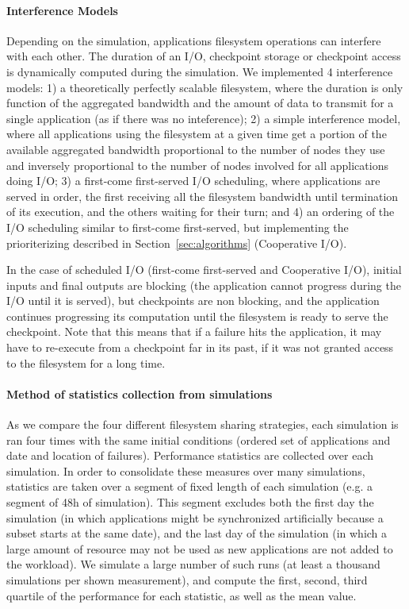 \documentclass[conference]{IEEEtran}
\begin{document}
\paragraph*{Interference Models}
Depending on the simulation, applications filesystem operations can
interfere with each other. The duration of an I/O, checkpoint storage
or checkpoint access is dynamically computed during the simulation. We
implemented 4 interference models: 1) a theoretically perfectly scalable
filesystem, where the duration is only function of the aggregated
bandwidth and the amount of data to transmit for a single application
(as if there was no inteference); 2) a simple interference model,
where all applications using the filesystem at a given time get a
portion of the available aggregated bandwidth proportional to the
number of nodes they use and inversely proportional to the number of
nodes involved for all applications doing I/O; 3) a first-come
first-served I/O scheduling, where applications are served in order,
the first receiving all the filesystem bandwidth until termination of
its execution, and the others waiting for their turn; and 4) an
ordering of the I/O scheduling similar to first-come first-served, but
implementing the prioriterizing described in
Section~\ref{sec:algorithms} (Cooperative I/O).

In the case of scheduled I/O (first-come first-served and Cooperative
I/O), initial inputs and final outputs are blocking (the application
cannot progress during the I/O until it is served), but checkpoints
are non blocking, and the application continues progressing its
computation until the filesystem is ready to serve the
checkpoint. Note that this means that if a failure hits the
application, it may have to re-execute from a checkpoint far in its
past, if it was not granted access to the filesystem for a long time.

\paragraph*{Method of statistics collection from simulations}
As we compare the four different filesystem sharing strategies, each
simulation is ran four times with the same initial conditions (ordered
set of applications and date and location of failures). Performance
statistics are collected over each simulation. In order to consolidate
these measures over many simulations, statistics are taken over a
segment of fixed length of each simulation (e.g. a segment of 48h of
simulation). This segment excludes both the first day the simulation
(in which applications might be synchronized artificially because a
subset starts at the same date), and the last day of the simulation
(in which a large amount of resource may not be used as new
applications are not added to the workload). We simulate a large
number of such runs (at least a thousand simulations per shown
measurement), and compute the first, second, third quartile of the
performance for each statistic, as well as the mean value.
\end{document}
